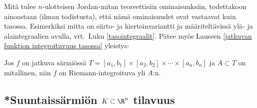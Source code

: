 Mitä tulee $n$-ulotteisen Jordan-mitan teoreettisiin ominaisuuksiin, todettakoon ainoastaan
(ilman todistusta), että nämä ominaisuudet ovat vastaavat kuin tasossa. Esimerkiksi mitta on
siirto- ja kiertoinvariantti ja määriteltävissä ylä- ja alaintegraalien avulla, vrt.\ Luku
\ref{tasointegraalit}. Pätee myös Lauseen \ref{jatkuvan funktion integroituvuus tasossa}
yleistys:
\begin{*Lause} \label{jatkuvan funktion integroituvuus Rn:ssä}
 Jos $f$ on jatkuva särmiössä
$T=[a_1,b_1] \times [a_2,b_2] \times \cdots \times [a_n,b_n]$ ja $A \subset T$ on mitallinen,
niin $f$ on Riemann-integroituva yli $A$:n.
\end{*Lause} 

\subsection{*Suuntaissärmiön $K\subset\R^n$ tilavuus}

